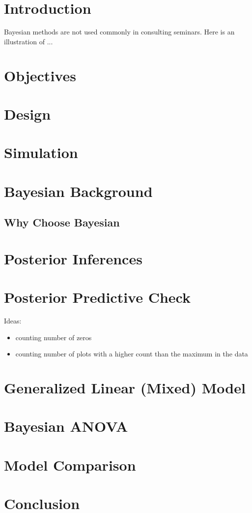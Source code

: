 \documentclass[12pt]{article}
\begin{document}
\section{Introduction}
Bayesian methods are not used commonly in consulting seminars.  Here is an illustration of ...
\section{Objectives}
\section{Design}
\section{Simulation}
\section{Bayesian Background}
\subsection{Why Choose Bayesian}
\section{Posterior Inferences}
\section{Posterior Predictive Check}

Ideas:
\begin{itemize}
\item counting number of zeros\\
\item counting number of plots with a higher count than the maximum in the data\\
\end{itemize}

\section{Generalized Linear (Mixed) Model}
\section{Bayesian ANOVA}
\section{Model Comparison}

\section{Conclusion}
\end{document}

